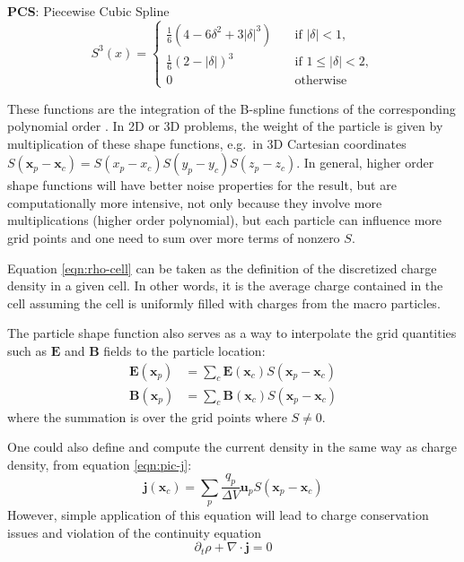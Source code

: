 \textbf{PCS}: Piecewise Cubic Spline
\begin{equation}
  \label{eq:third-order-deposit}
  S^3(x) =
  \begin{cases}
    \frac{1}{6} \left( 4 - 6\delta^2 + 3|\delta|^3 \right) & \quad \text{if } |\delta| < 1, \\
    \frac{1}{6} \left( 2 - |\delta| \right)^3 & \quad \text{if } 1 \leq |\delta| < 2, \\
    0                      & \quad \text{otherwise}
  \end{cases}
\end{equation}

These functions are the integration of the B-spline functions of the
corresponding polynomial order \citep{haugboelle_photon-plasma:_2012}.
In 2D or 3D problems, the weight of the particle is given by multiplication of
these shape functions, e.g.\ in 3D Cartesian coordinates $S(\mathbf{x}_{p} -
\mathbf{x}_{c}) = S(x_{p} - x_{c})S(y_{p} - y_{c})S(z_{p} - z_{c})$. In general,
higher order shape functions will have better noise properties for the result,
but are computationally more intensive, not only because they involve more
multiplications (higher order polynomial), but each particle can influence more
grid points and one need to sum over more terms of nonzero $S$.

Equation \eqref{eqn:rho-cell} can be taken as the definition of the discretized
charge density in a given cell. In other words, it is the average charge
contained in the cell assuming the cell is uniformly filled with charges from
the macro particles.

The particle shape function also serves as a way to interpolate the grid
quantities such as $\mathbf{E}$ and $\mathbf{B}$ fields to the particle
location:
\begin{align}
    \label{eqn:interpolate}
    \mathbf{E}(\mathbf{x}_p) &= \sum_c \mathbf{E}(\mathbf{x}_c) S(\mathbf{x}_p - \mathbf{x}_c) \\
    \mathbf{B}(\mathbf{x}_p) &= \sum_c \mathbf{B}(\mathbf{x}_c) S(\mathbf{x}_p - \mathbf{x}_c)
\end{align}
where the summation is over the grid points where $S \neq 0$.

One could also define and compute the current density in the same way as charge density,
from equation \eqref{eqn:pic-j}:
\begin{equation}
  \label{eq:naive-j}
  \mathbf{j} ( \mathbf{x}_{c} ) = \sum_{p} \frac{q_{p}}{\Delta V}\mathbf{u}_p S (
  \mathbf{x}_{p} -\mathbf{x}_{c} )
\end{equation}
However, simple application of this equation will lead to charge
conservation issues and violation of the continuity equation \citetext{see e.g.\
  \citealp{hockney_computer_1981}, \citealp{birdsall_plasma_1991}}
\begin{equation}
    \label{eq:continuity}
    \partial_t\rho + \nabla\cdot \mathbf{j} = 0
\end{equation}


